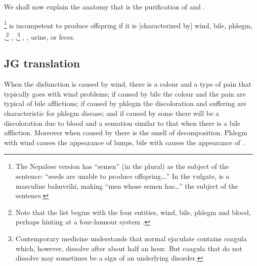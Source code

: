 \begin{translation}
    
    \item [1] We shall now explain the anatomy that is the purification of 
     and 
    .
    
    
    \item [3]  \footnote{The Nepalese version has
     “semen” (in the plural) as the subject of the sentence: “seeds 
    are
    unable to produce offspring\ldots.”  In the vulgate, 
    is a masculine bahuvrīhi, making “men whose semen has\ldots” the
    subject of the sentence.} is incompetent to produce offspring if it
    is [characterized by] wind, bile, phlegm,
    ,\footnote{Note that the list begins with the
        four entities, wind, bile, phlegm and blood, perhaps hinting at a
        four-humour system \citep[see][485--486]{wuja-2000}.}
        ,
        ,\footnote{Contemporary medicine understands
            that normal ejaculate contains coagula which, however, dissolve after
            about half an hour.  But coagula that do not dissolve may sometimes
            be a sign of an underlying disorder.} , , urine, or feces.
    
 
\subsection{JG translation}             
 

 \item[4]
 
  When the disfunction is caused by wind, there is a colour and a type of pain 
  that typically goes with wind problems; if  caused by bile the colour and the 
  pain are typical of bile afflictions; if caused by phlegm the discoloration and 
  suffering are characteristic for phlegm disease; and if caused by some 
   there will be a discoloration due to blood and a 
  sensation similar to 
  that when there is a bile affliction. Moreover when caused by 
   there is the smell of
  decomposition.  Phlegm with wind causes the appearance of lumps,
  bile with   causes the appearance of 
  . 
      

\end{translation}
